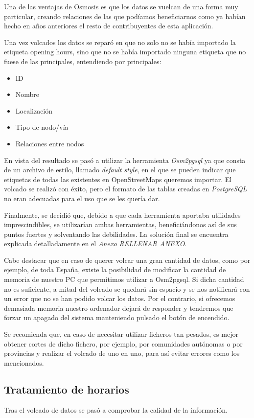 Una de las ventajas de  Osmosis es que los datos se vuelcan de una forma muy particular, creando relaciones de las que podíamos beneficiarnos como ya habían hecho en años anteriores el resto de contribuyentes de esta aplicación.

Una vez volcados los datos se reparó en que no solo no se había importado la etiqueta opening hours, sino que no se había importado ninguna etiqueta que no fuese de las principales, entendiendo por principales:
\begin{itemize}
\item ID
\item Nombre
\item Localización
\item Tipo de nodo/vía
\item Relaciones entre nodos
\end{itemize}

En vista del resultado se pasó a utilizar la herramienta \textit{Osm2pgsql} ya que consta de un archivo de estilo, llamado \textit{default style}, en el que se pueden indicar que etiquetas de todas las existentes en OpenStreetMaps queremos importar.
El volcado se realizó con éxito, pero el formato de las tablas creadas en \textit{PostgreSQL} no eran adecuadas para el uso que se les quería dar.

Finalmente, se decidió que, debido a que cada herramienta aportaba utilidades imprescindibles, se utilizarían ambas herramientas, beneficiándonos así de sus puntos fuertes y solventando las debilidades.
La solución final se encuentra explicada detalladamente en el \textit{Anexo RELLENAR ANEXO}.

Cabe destacar que en caso de querer volcar una gran cantidad de datos, como por ejemplo, de toda España, existe la posibilidad de modificar la cantidad de memoria de nuestro PC que permitimos utilizar a Osm2pgsql. Si dicha cantidad no es suficiente, a mitad del volcado se quedará sin espacio y se nos notificará con un error que no se han podido volcar los datos. Por el contrario, si ofrecemos demasiada memoria nuestro ordenador dejará de responder y tendremos que forzar un apagado del sistema manteniendo pulsado el botón de encendido.

Se recomienda que, en caso de necesitar utilizar ficheros tan pesados, es mejor obtener cortes de dicho fichero, por ejemplo, por comunidades autónomas o por provincias y realizar el volcado de uno en uno, para así evitar errores como los mencionados.

\subsection{Tratamiento de horarios}
Tras el volcado de datos se pasó a comprobar la calidad de la información.

